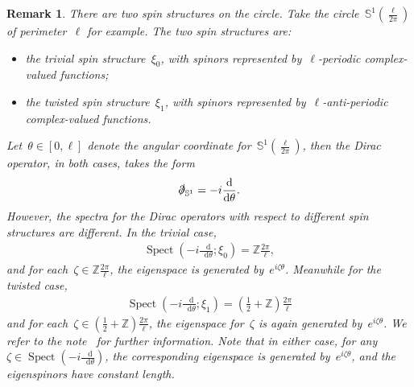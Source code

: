 \documentclass[10pt,a4paper]{amsart}
\newcommand{\pd}{\slashed{\partial}}
\newcommand{\dd}{\mathop{}\!\mathrm{d}}
\newcommand{\sph}{\mathbb{S}}
\newcommand{\bZ}{\mathbb{Z}}
\DeclareMathOperator{\Spect}{Spect}
\newtheorem{rmk}[thm]{Remark}
\begin{document}
\begin{rmk}
    There are two spin structures on the circle.
    Take the circle~$\sph^1(\frac{\ell}{2\pi})$ of perimeter~$\ell$ for example.
    The two spin structures are:
    \begin{itemize}
        \item the trivial spin structure~$\xi_0$, with spinors represented by~$\ell$-periodic complex-valued functions;
        \item the twisted spin structure~$\xi_1$, with spinors represented by~$\ell$-anti-periodic complex-valued functions. 
    \end{itemize}
    Let~$\theta\in [0,\ell]$ denote the angular coordinate for~$\sph^1(\frac{\ell}{2\pi})$, then the Dirac operator, in both cases, takes the form 
    \begin{align}
        \pd_{\sph^1}=-i\frac{\dd}{\dd\theta}.
    \end{align}
    However, the spectra for the Dirac operators with respect to different spin structures are different. 
    In the trivial case,
    \begin{align}
    \Spect(-i\frac{\dd}{\dd \theta};\xi_0)= \bZ \frac{2\pi}{\ell}, 
    \end{align}
    and for each~$\zeta\in\mathbb{Z}\frac{2\pi}{\ell}$, the eigenspace is generated by~$e^{i\zeta\theta}$. 
    Meanwhile for the twisted case, 
    \begin{align}
    \Spect(-i\frac{\dd}{\dd\theta};\xi_1)=(\frac{1}{2}+\mathbb{Z})\frac{2\pi}{\ell}
    \end{align}
    and for each~$\zeta\in(\frac{1}{2}+\mathbb{Z})\frac{2\pi}{\ell}$, the eigenspace for~$\zeta$ is again generated by~$e^{i\zeta\theta}$. 
    We refer to the note~\cite{Varilly2006Dirac} for further information. 
    Note that in either case, for any~$\zeta\in\Spect(-i\frac{\dd}{\dd \theta})$, the corresponding eigenspace is generated by~$e^{i\zeta\theta}$, and the eigenspinors have \emph{constant length}. 
\end{rmk}
\end{document}
